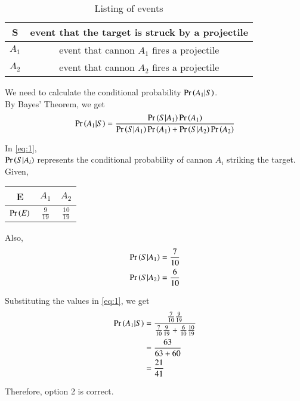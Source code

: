 \documentclass[journal,12pt,twocolumn]{IEEEtran}
\begin{document}
\begin{table}[h!]
\centering
\caption{Listing of events }
\label{table:1}
\begin{tabular}{|c|c|}
    \hline
    S & {\small event that the target is struck by a projectile}\\[0.5ex]
    \hline
    $A_{1}$ & {\small event that cannon $A_{1}$ fires a projectile}\\[0.5ex]
    \hline
    $A_{2}$ & {\small event that cannon $A_{2}$ fires a projectile}\\[0.5ex]
    \hline
\end{tabular}
\end{table}
We need to calculate the conditional probability $\Pr\left(A_{1}|S\right)$.\\
By Bayes' Theorem, we get 
\begin{align}
\label{eq:1}
\Pr\left(A_{1}|S\right)=\frac{\Pr\left(S|A_{1}\right)\Pr\left(A_{1}\right)}{\Pr\left(S|A_{1}\right)\Pr\left(A_{1}\right)+\Pr\left(S|A_{2}\right)\Pr\left(A_{2}\right)}
\end{align}

In \eqref{eq:1},\\
 $\Pr\left(S|A_{i}\right)$ represents the conditional probability of cannon $A_{i}$ striking the target.\\
Given,

\begin{table}[h!]
\centering
\label{table:2}
\begin{tabular}{|c|c|c|}
    \hline
    E & $A_{1}$ & $A_{2}$\\
    \hline
    $\Pr\left(E\right)$ & $\frac{9}{19}$ & $\frac{10}{19}$\\[1ex]
    \hline
\end{tabular}
\end{table}
Also,
\begin{align}
\Pr\left(S|A_{1}\right)=\frac{7}{10}\\
\Pr\left(S|A_{2}\right)=\frac{6}{10}\\
\end{align}

Substituting the values in \eqref{eq:1}, we get
\begin{align}
\Pr\left(A_{1}|S\right)={}&\frac{\frac{7}{10}\frac{9}{19}}{\frac{7}{10}\frac{9}{19}+\frac{6}{10}\frac{10}{19}}\\
={}&\frac{63}{63+60}\\
={}&\frac{21}{41}
\end{align}

 Therefore, option 2 is correct.
\end{document}
